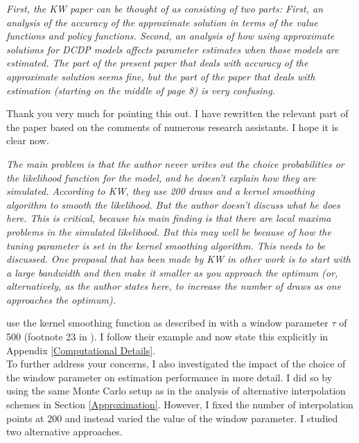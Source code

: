 \begin{boenumerate}
\item \textit{First, the KW paper can be thought of as consisting of two parts: First, an analysis of the accuracy of the approximate solution in terms of the value functions and policy functions. Second, an analysis of how using approximate solutions for DCDP models affects parameter estimates when those models are estimated. The part of the present paper that deals with accuracy of the approximate solution seems fine, but the part of the paper that deals with estimation (starting on the middle of page 8) is very confusing.}\vspace{0.5cm}

Thank you very much for pointing this out. I have rewritten the relevant part of the paper based on the comments of numerous research assistants. I hope it is clear now.
\item \textit{The main problem is that the author never writes out the choice probabilities or the likelihood function for the model, and he doesn't explain how they are simulated. According to KW, they use 200 draws and a kernel smoothing algorithm to smooth the likelihood. But the author doesn't discuss what he does here. This is critical, because his main finding is that there are local maxima problems in the simulated likelihood. But this may well be because of how the tuning parameter is set in the kernel smoothing algorithm. This needs to be discussed. One proposal that has been made by KW in other work is to start with a large bandwidth and then make it smaller as you approach the optimum (or, alternatively, as the author states here, to increase the number of draws as one approaches the optimum).}\vspace{0.5cm}

\cite{Keane.1994} use the kernel smoothing function as described in \citet{McFadden.1989} with a window parameter $\tau$ of 500 (footnote 23 in \cite{Keane.1994}). I follow their example and now state this explicitly in Appendix \ref{Computational Details}.\\\newline
%
To further address your concerns, I also investigated the impact of the choice of the window parameter on estimation performance in more detail. I did so by using the same Monte Carlo setup as in the analysis of alternative interpolation schemes in Section \ref{Approximation}. However, I fixed the number of interpolation points at 200 and instead varied the value of the window parameter. I studied two alternative approaches.


\end{boenumerate}
